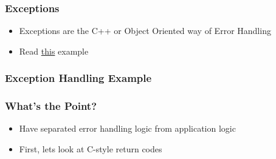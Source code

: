 \subsubsection{Exceptions}\label{exceptions}

\begin{itemize}
\itemsep1pt\parskip0pt
\item
  Exceptions are the C++ or Object Oriented way of Error Handling
\item
  Read
  \href{https://msdn.microsoft.com/en-us/library/hh279678.aspx}{this}
  example
\end{itemize}

\subsubsection{Exception Handling
Example}\label{exception-handling-example}

\begin{Shaded}
\begin{Highlighting}[]
  \NormalTok{; \}}

 
\NormalTok{\{}
  \NormalTok{\{}
     \NormalTok{;}
     
    \NormalTok{\{}
       \NormalTok{);}
    \NormalTok{\}}
  \NormalTok{\}}
   
  \NormalTok{\{}
     
  \NormalTok{\}}
\NormalTok{\}}

\end{Highlighting}
\end{Shaded}

\subsubsection{What's the Point?}\label{whats-the-point}

\begin{itemize}
\itemsep1pt\parskip0pt
\item
  Have separated error handling logic from application logic
\item
  First, lets look at C-style return codes
\end{itemize}

